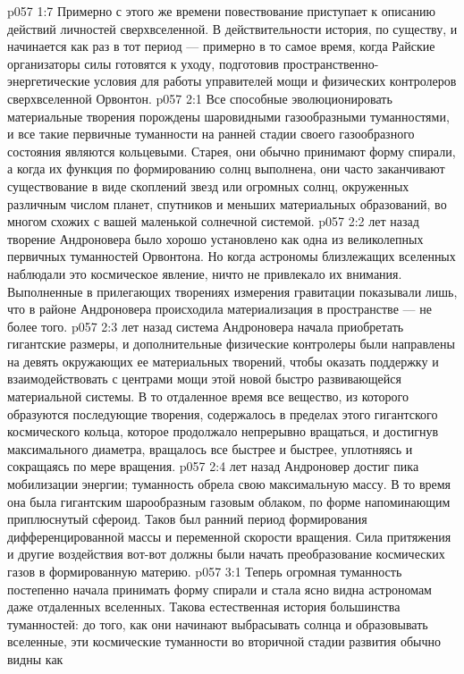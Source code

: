 \vs p057 1:7 Примерно с этого же времени повествование приступает к описанию действий личностей сверхвселенной. В действительности история, по существу, и начинается как раз в тот период --- примерно в то самое время, когда Райские организаторы силы готовятся к уходу, подготовив пространственно\hyp{}энергетические условия для работы управителей мощи и физических контролеров сверхвселенной Орвонтон.
\vs p057 2:1 Все способные эволюционировать материальные творения порождены шаровидными газообразными туманностями, и все такие первичные туманности на ранней стадии своего газообразного состояния являются кольцевыми. Старея, они обычно принимают форму спирали, а когда их функция по формированию солнц выполнена, они часто заканчивают существование в виде скоплений звезд или огромных солнц, окруженных различным числом планет, спутников и меньших материальных образований, во многом схожих с вашей маленькой солнечной системой.
\vs p057 2:2 \pc {} лет назад творение Андроновера было хорошо установлено как одна из великолепных первичных туманностей Орвонтона. Но когда астрономы близлежащих вселенных наблюдали это космическое явление, ничто не привлекало их внимания. Выполненные в прилегающих творениях измерения гравитации показывали лишь, что в районе Андроновера происходила материализация в пространстве --- не более того.
\vs p057 2:3 \pc {} лет назад система Андроновера начала приобретать гигантские размеры, и дополнительные физические контролеры были направлены на девять окружающих ее материальных творений, чтобы оказать поддержку и взаимодействовать с центрами мощи этой новой быстро развивающейся материальной системы. В то отдаленное время все вещество, из которого образуются последующие творения, содержалось в пределах этого гигантского космического кольца, которое продолжало непрерывно вращаться, и достигнув максимального диаметра, вращалось все быстрее и быстрее, уплотняясь и сокращаясь по мере вращения.
\vs p057 2:4 \pc {} лет назад Андроновер достиг пика мобилизации энергии; туманность обрела свою максимальную массу. В то время она была гигантским шарообразным газовым облаком, по форме напоминающим приплюснутый сфероид. Таков был ранний период формирования дифференцированной массы и переменной скорости вращения. Сила притяжения и другие воздействия вот\hyp{}вот должны были начать преобразование космических газов в формированную материю.
\vs p057 3:1 Теперь огромная туманность постепенно начала принимать форму спирали и стала ясно видна астрономам даже отдаленных вселенных. Такова естественная история большинства туманностей: до того, как они начинают выбрасывать солнца и образовывать вселенные, эти космические туманности во вторичной стадии развития обычно видны как 
